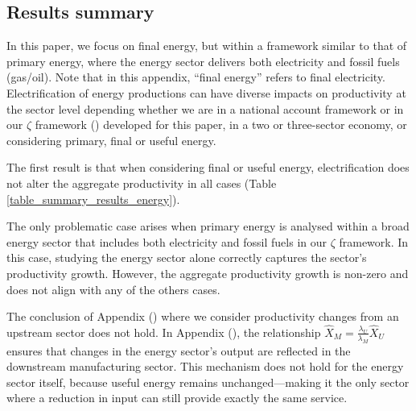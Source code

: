 \documentclass[11pt]{article}
\begin{document}
\subsection{Results summary}

In this paper, we focus on final energy, but within a framework similar to that of primary energy, where the energy sector delivers both electricity and fossil fuels (gas/oil). Note that in this appendix, ``final energy'' refers to final electricity. Electrification of energy productions can have diverse impacts on productivity at the sector level depending whether we are in a national account framework or in our $\zeta$ framework () developed for this paper, in a two or three-sector economy, or considering primary, final or useful energy.

The first result is that when considering final or useful energy, electrification does not alter the aggregate productivity in all cases (Table \ref{table_summary_results_energy}). 

The only problematic case arises when primary energy is analysed within a broad energy sector that includes both electricity and fossil fuels in our $\zeta$ framework. In this case, studying the energy sector alone correctly captures the sector's productivity growth. However, the aggregate productivity growth is non-zero and does not align with any of the others cases. 

The conclusion of Appendix () where we consider productivity changes from an upstream sector does not hold. In Appendix (), the relationship $\hat{X}_M = \frac{\lambda_U}{\lambda_M} \hat{X}_U$ ensures that changes in the energy sector’s output are reflected in the downstream manufacturing sector. This mechanism does not hold for the energy sector itself, because useful energy remains unchanged—making it the only sector where a reduction in input can still provide exactly the same service.
\end{document}
